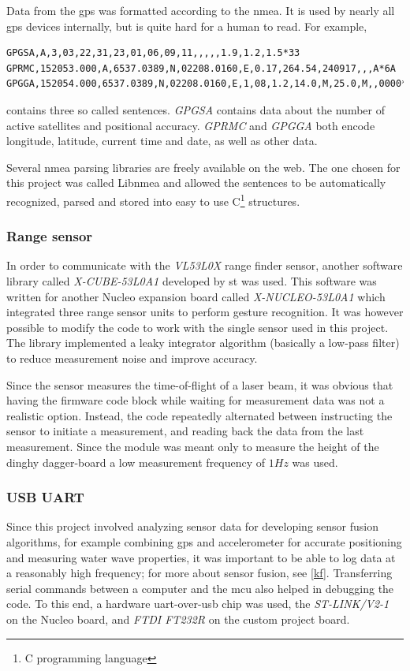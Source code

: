 Data from the \gls{gps} was formatted according to the \gls{nmea}. It is used by nearly all \gls{gps} devices internally, but is quite hard for a human to read. For example,
\begin{lstlisting}
GPGSA,A,3,03,22,31,23,01,06,09,11,,,,,1.9,1.2,1.5*33
GPRMC,152053.000,A,6537.0389,N,02208.0160,E,0.17,264.54,240917,,,A*6A
GPGGA,152054.000,6537.0389,N,02208.0160,E,1,08,1.2,14.0,M,25.0,M,,0000*68
\end{lstlisting}
contains three so called sentences. \emph{GPGSA} contains data about the number of active satellites and positional accuracy. \emph{GPRMC} and \emph{GPGGA} both encode longitude, latitude, current time and date, as well as other data.

Several \gls{nmea} parsing libraries are freely available on the web. The one chosen for this project was called Libnmea\cite{libnmea} and allowed the sentences to be automatically recognized, parsed and stored into easy to use C\footnote{C programming language} structures.

\subsubsection{Range sensor}
In order to communicate with the \emph{VL53L0X} range finder sensor, another software library called \emph{X-CUBE-53L0A1}\cite{x-cube-53l0a} developed by \gls{st} was used. This software was written for another Nucleo expansion board called \emph{X-NUCLEO-53L0A1} which integrated three range sensor units to perform gesture recognition. It was however possible to modify the code to work with the single sensor used in this project. The library implemented a leaky integrator algorithm (basically a low-pass filter) to reduce measurement noise and improve accuracy.

Since the sensor measures the time-of-flight of a laser beam, it was obvious that having the firmware code block while waiting for measurement data was not a realistic option. Instead, the code repeatedly alternated between instructing the sensor to initiate a measurement, and reading back the data from the last measurement. Since the module was meant only to measure the height of the dinghy dagger-board  a low measurement frequency of $1Hz$ was used.

\subsubsection{USB UART}
\label{usb-uart}
Since this project involved analyzing sensor data for developing sensor fusion algorithms, for example combining \gls{gps} and accelerometer for accurate positioning and measuring water wave properties, it was important to be able to log data at a reasonably high frequency; for more about sensor fusion, see \autoref{kf}. Transferring serial commands between a computer and the \gls{mcu} also helped in debugging the code. To this end, a hardware \gls{uart}-over-\gls{usb} chip was used, the \emph{ST-LINK/V2-1} on the Nucleo board, and \emph{FTDI FT232R} on the custom project board.

